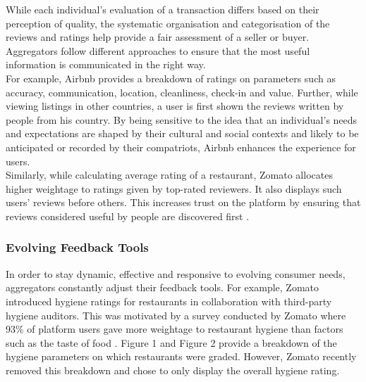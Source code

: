\documentclass[a4paper, 12pt]{article}
\begin{document}
                    While each individual’s evaluation of a transaction differs based on their perception of quality, the systematic organisation and categorisation of the reviews and ratings help provide a fair assessment of a seller or buyer. Aggregators follow different approaches to ensure that the most useful information is communicated in the right way. \\
                    
                    For example, Airbnb provides a breakdown of ratings on parameters such as accuracy, communication, location, cleanliness, check-in and value. Further, while viewing listings in other countries, a user is first shown the reviews written by people from his country. By being sensitive to the idea that an individual’s needs and expectations are shaped by their cultural and social contexts and likely to be anticipated or recorded by their compatriots, Airbnb enhances the experience for users. \\

Similarly, while calculating average rating of a restaurant, Zomato allocates higher weightage to ratings given by top-rated reviewers. It also displays such users’ reviews before others. This increases trust on the platform by ensuring that reviews considered useful by people are discovered first \parencite{GoyalD2012}. 
                    
                    \subsubsection{Evolving Feedback Tools}
                    
                   In order to stay dynamic, effective and responsive to evolving consumer needs, aggregators constantly adjust their feedback tools. For example, Zomato introduced hygiene ratings for restaurants in collaboration with third-party hygiene auditors. This was motivated by a survey conducted by Zomato where 93\% of platform users gave more weightage to restaurant hygiene than factors such as the taste of food \parencite{GoyalD2017}. Figure 1 and Figure 2 provide a breakdown of the hygiene parameters on which restaurants were graded. However, Zomato recently removed this breakdown and chose to only display the overall hygiene rating. \\
                   
\end{document}

